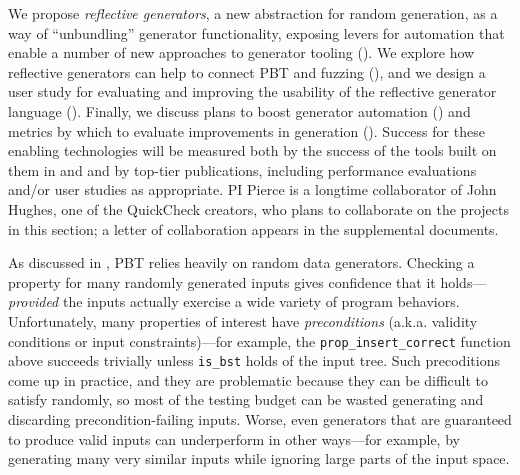 We propose {\em reflective
generators}, a new abstraction for random generation, as a way of
``unbundling'' generator
functionality, exposing levers for
automation that enable a number of new approaches to generator
tooling (). We explore how reflective generators can
help to connect PBT and fuzzing (),
and we design
a user study for evaluating and improving the usability of the reflective
generator language (). Finally, we discuss
plans to boost generator automation () and metrics
by which to evaluate improvements in generation ().
Success for these enabling technologies will be measured both by the success of
the tools built on them in  and 
and by top-tier publications, including performance evaluations and/or
user studies as appropriate.
PI Pierce is a longtime collaborator of John Hughes, one of the
QuickCheck creators, who plans to collaborate on the projects
in this section; a letter of collaboration appears in the supplemental
documents.

As discussed in , PBT relies heavily on {random data
generators}.  Checking a property for many randomly generated inputs
gives confidence that it holds---{\em provided} the inputs actually
exercise a wide variety of program behaviors.
Unfortunately,
many properties of interest have {\em preconditions}
({a.k.a.} {validity conditions} or {input constraints})---for example,
the \verb|prop_insert_correct| function above succeeds trivially unless
\verb|is_bst| holds of the input tree.  Such precoditions come up in
practice, and they are problematic because they can be
difficult to satisfy randomly, so most of the testing budget
can be wasted generating and discarding precondition-failing inputs.
%
%
Worse, even generators that are guaranteed to produce valid
inputs can underperform in other ways---for example, by
generating many very similar inputs while ignoring large parts of
the input space.

